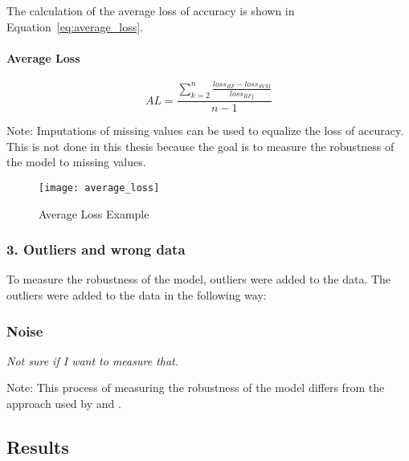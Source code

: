 The calculation of the average loss of accuracy is shown in Equation~\ref{eq:average_loss}.

\paragraph*{Average Loss}

\begin{equation}
    \label{eq:average_loss}
    AL = \frac{\sum_{k=2}^{n} \frac{loss_{RF} - loss_{SVM}}{loss_{RFj}}}{n-1}
\end{equation}

Note: Imputations of missing values can be used to equalize the loss of accuracy. This is not
done in this thesis because the goal is to measure the robustness of the model to missing values.

\begin{figure}[H]
    \centering
    \texttt{[image: average\_loss]}
    \caption{Average Loss Example}
    \label{fig:average_loss}
\end{figure}

\subsubsection*{3. Outliers and wrong data}
To measure the robustness of the model, outliers were added to the data. The outliers were added
to the data in the following way:


\subsubsection*{Noise}
\textit{Not sure if I want to measure that.}


Note: This process of measuring the robustness of the model differs from the approach used by
\cite{siebert_constructionqualitymodel_} and \cite{saez_evaluatingclassifierbehavior_2016}.

\subsection{Results}

